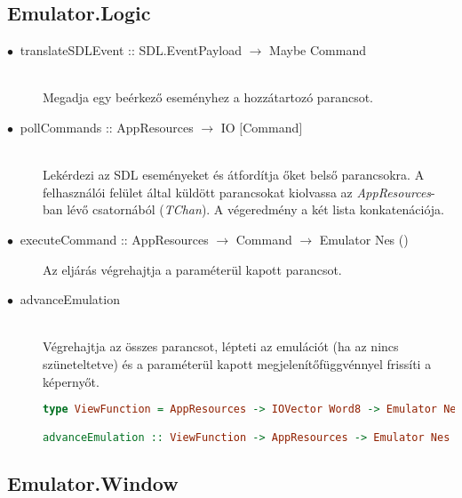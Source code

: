\subsection{Emulator.Logic}

\begin{description}
	\item[$\bullet\:$ translateSDLEvent :: SDL.EventPayload $\rightarrow$ Maybe Command] \hfill \\
	Megadja egy beérkező eseményhez a hozzátartozó parancsot.
	\item[$\bullet\:$ pollCommands :: AppResources $\rightarrow$ IO $\lbrack$Command$\rbrack$] \hfill \\
	Lekérdezi az SDL eseményeket és átfordítja őket belső parancsokra. A felhasználói felület által küldött parancsokat kiolvassa az \emph{AppResources}-ban lévő csatornából (\emph{TChan}). A végeredmény a két lista konkatenációja. 
	\item[$\bullet\:$ executeCommand :: AppResources $\rightarrow$ Command $\rightarrow$ Emulator Nes ()] \hfill
	Az eljárás végrehajtja a paraméterül kapott parancsot.
	\item[$\bullet\:$ advanceEmulation] \hfill \\
	Végrehajtja az összes parancsot, lépteti az emulációt (ha az nincs szüneteltetve) és a paraméterül kapott megjelenítőfüggvénnyel frissíti a képernyőt.
	\vspace{0.2cm}
\begin{lstlisting}[language=Haskell, basicstyle=\scriptsize]
type ViewFunction = AppResources -> IOVector Word8 -> Emulator Nes ()

advanceEmulation :: ViewFunction -> AppResources -> Emulator Nes Bool
\end{lstlisting}
\end{description}

\subsection{Emulator.Window}

